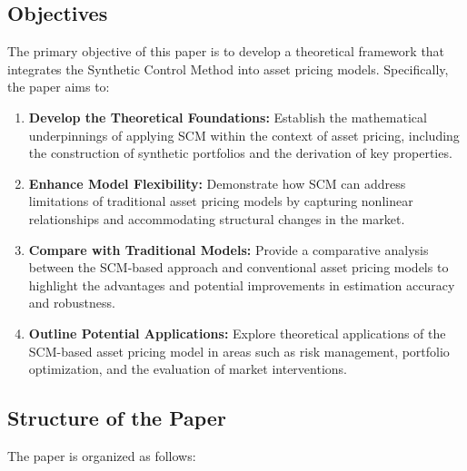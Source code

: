 \subsection{Objectives}
The primary objective of this paper is to develop a theoretical framework that integrates the Synthetic Control Method into asset pricing models. Specifically, the paper aims to:

\begin{enumerate}
    \item \textbf{Develop the Theoretical Foundations:} Establish the mathematical underpinnings of applying SCM within the context of asset pricing, including the construction of synthetic portfolios and the derivation of key properties.
    \item \textbf{Enhance Model Flexibility:} Demonstrate how SCM can address limitations of traditional asset pricing models by capturing nonlinear relationships and accommodating structural changes in the market.
    \item \textbf{Compare with Traditional Models:} Provide a comparative analysis between the SCM-based approach and conventional asset pricing models to highlight the advantages and potential improvements in estimation accuracy and robustness.
    \item \textbf{Outline Potential Applications:} Explore theoretical applications of the SCM-based asset pricing model in areas such as risk management, portfolio optimization, and the evaluation of market interventions.
\end{enumerate}

\subsection{Structure of the Paper}
The paper is organized as follows:

